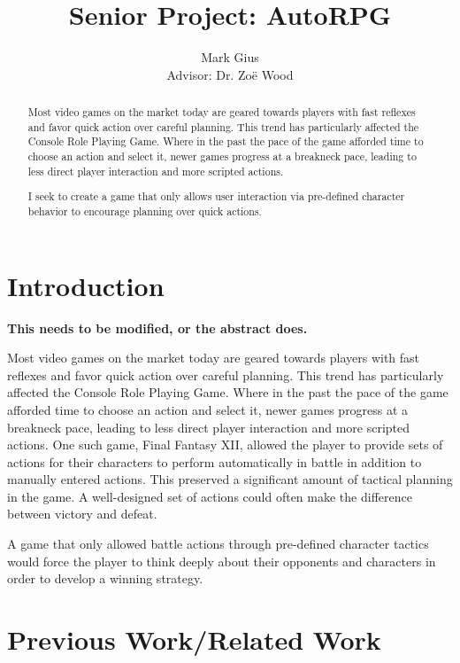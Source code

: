 \documentclass[11pt]{article}
\begin{document}
\author{Mark Gius\vspace{10pt} \\
        Advisor: Dr. Zo\"e Wood
        }
\title{Senior Project: AutoRPG}
\maketitle

\begin{abstract}
Most video games on the market today are geared towards players with fast reflexes and favor quick action over careful planning. This trend has particularly affected the Console Role Playing Game.  Where in the past the pace of the game afforded time to choose an action and select it, newer games progress at a breakneck pace, leading to less direct player interaction and more scripted actions.

I seek to create a game that only allows user interaction via pre-defined character behavior to encourage planning over quick actions.
\end{abstract}

\doublespacing
\section{Introduction}

\textbf{This needs to be modified, or the abstract does.}

Most video games on the market today are geared towards players with fast reflexes and favor quick action over careful planning. This trend has particularly affected the Console Role Playing Game.  Where in the past the pace of the game afforded time to choose an action and select it, newer games progress at a breakneck pace, leading to less direct player interaction and more scripted actions.  One such game, Final Fantasy XII, allowed the player to provide sets of actions for their characters to perform automatically in battle in addition to manually entered actions. \cite{Gambits} This preserved a significant amount of tactical planning in the game. A well-designed set of actions could often make the difference between victory and defeat.

A game that only allowed battle actions through pre-defined character tactics would force the player to think deeply about their opponents and characters in order to develop a winning strategy. 

\section{Previous Work/Related Work}
\end{document}
